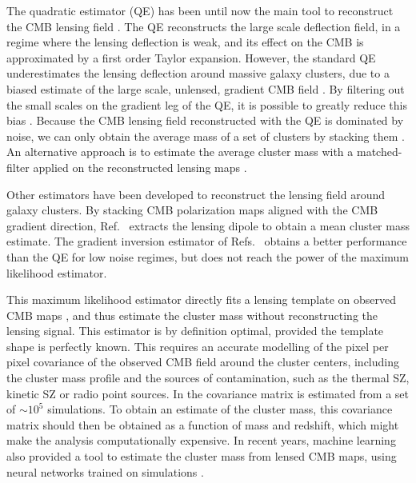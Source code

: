 \documentclass[prd, superscriptaddress, tightenlines, longbibliography, nofootinbib, eqsecnum, amsfonts, amsmath, floatfix, twocolumn, notitlepage]{revtex4-2}
\newcommand{\LL}[1]{{\color{orange}{LL: #1}}}
\begin{document}
The quadratic estimator (QE) has been until now the main tool to reconstruct the CMB lensing field \cite{Hu:2001tn, Hu:2001kj, Okamoto:2003zw, Planck:2018lbu}. The QE reconstructs the large scale deflection field, in a regime where the lensing deflection is weak, and its effect on the CMB is \LL{roughly (?)} approximated by a first order Taylor expansion. 
However, the standard QE underestimates the lensing deflection around massive galaxy clusters, due to a biased estimate of the large scale, unlensed, gradient CMB field \cite{Maturi:2004zj}. By filtering out the small scales on the gradient leg of the QE, it is possible to greatly reduce this bias \cite{Hu:2007bt}.
Because the CMB lensing field reconstructed with the QE is dominated by noise, we can only obtain the average mass of a set of clusters by stacking them \cite{DES:2017fyz, Geach:2017crt, DES:2018myw, ACT:2020izl}. An alternative approach is to estimate the average cluster mass with a matched-filter applied on the reconstructed lensing maps \cite{Melin:2014uaa, Louis:2016gvv, Zubeldia:2019brr}.

Other estimators have been developed to reconstruct the lensing field around galaxy clusters. 
By stacking CMB polarization maps aligned with the CMB gradient direction, Ref.~\cite{SPT:2019qkp} extracts the lensing dipole to obtain a mean cluster mass estimate.  
The gradient inversion estimator of Refs.~\cite{Horowitz:2017iql, Hadzhiyska:2019cle} obtains a better performance than the QE for low noise regimes, but does not reach the power of the maximum likelihood estimator.  

This maximum likelihood estimator directly fits a lensing template on observed CMB maps \cite{Lewis:2005fq,Baxter:2014frs, Raghunathan:2017cle}, and thus estimate the cluster mass without reconstructing the lensing signal. This estimator is by definition optimal, provided the template shape is perfectly known. This requires an accurate modelling of the pixel per pixel covariance of the observed CMB field around the cluster centers, including the cluster mass profile and the sources of contamination, such as the thermal SZ, kinetic SZ or radio point sources. In \cite{Raghunathan:2017cle} the covariance matrix is estimated from a set of $\sim 10^5$ simulations. To obtain an estimate of the cluster mass, this covariance matrix should then be obtained as a function of mass and redshift, which might make the analysis computationally expensive.
In recent years, machine learning also provided a tool to estimate the cluster mass from lensed CMB maps, using neural networks trained on simulations \cite{Gupta:2020him}.
\end{document}
